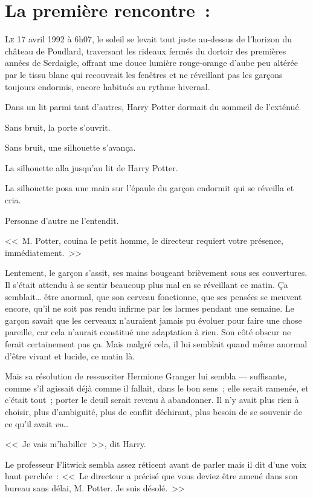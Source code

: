 
\section{La première rencontre~:}

\lettrine{L}{e} 17 avril 1992 à 6h07, le soleil se levait tout juste au-dessus de l'horizon du château de Poudlard, traversant les rideaux fermés du dortoir des premières années de Serdaigle, offrant une douce lumière rouge-orange d'aube peu altérée par le tissu blanc qui recouvrait les fenêtres et ne réveillant pas les garçons toujours endormis, encore habitués au rythme hivernal.

Dans un lit parmi tant d'autres, Harry Potter dormait du sommeil de l'exténué.

Sans bruit, la porte s'ouvrit.

Sans bruit, une silhouette s'avança.

La silhouette alla jusqu'au lit de Harry Potter.

La silhouette posa une main sur l'épaule du garçon endormit qui se réveilla et cria.

Personne d'autre ne l'entendit.

<<~M. Potter, couina le petit homme, le directeur requiert votre présence, immédiatement.~>>

Lentement, le garçon s'assit, ses mains bougeant brièvement sous ses couvertures. Il s'était attendu à se sentir beaucoup plus mal en se réveillant ce matin. Ça semblait… être anormal, que son cerveau fonctionne, que ses pensées se meuvent encore, qu'il ne soit pas rendu infirme par les larmes pendant une semaine. Le garçon savait que les cerveaux n'auraient jamais pu évoluer pour faire une chose pareille, car cela n'aurait constitué une adaptation à rien. Son côté obscur ne ferait certainement pas ça. Mais malgré cela, il lui semblait quand même anormal d'être vivant et lucide, ce matin là.

Mais sa résolution de ressusciter Hermione Granger lui sembla — suffisante, comme s'il agissait déjà comme il fallait, dans le bon sens~; elle serait ramenée, et c'était tout~; porter le deuil serait revenu à abandonner. Il n'y avait plus rien à choisir, plus d'ambiguïté, plus de conflit déchirant, plus besoin de se souvenir de ce qu'il avait \emph{vu}…

<<~Je vais m'habiller~>>, dit Harry.

Le professeur Flitwick sembla assez réticent avant de parler mais il dit d'une voix haut perchée~: <<~Le directeur a précisé que vous deviez être amené dans son bureau sans délai, M. Potter. Je suis désolé.~>>

